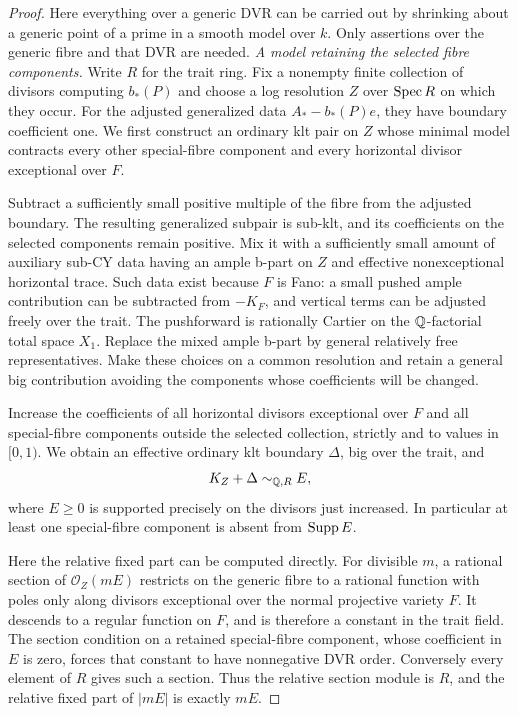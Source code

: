 \begin{proof}
Here everything over a generic DVR can be carried out by shrinking about a generic point of a prime in a smooth model over \(k\).
Only assertions over the generic fibre and that DVR are needed.
\emph{A model retaining the selected fibre components.}
Write $R$ for the trait ring.  Fix a nonempty finite collection of
divisors computing $b_*(P)$ and choose a log resolution $Z$ over
$\operatorname{Spec} R$ on which they occur.
For the adjusted generalized data $A_*-b_*(P)e$, they have boundary
coefficient one.  We first construct an ordinary klt pair on $Z$ whose
minimal model contracts every other special-fibre component and every
horizontal divisor exceptional over $F$.

Subtract a sufficiently small positive multiple of the fibre from the
adjusted boundary.  The resulting generalized subpair is sub-klt, and
its coefficients on the selected components remain positive.  Mix it
with a sufficiently small amount of auxiliary sub-CY data having an
ample b-part on $Z$ and effective nonexceptional horizontal trace.
Such data exist because $F$ is Fano: a small pushed ample contribution
can be subtracted from $-K_F$, and vertical terms can be adjusted freely
over the trait.  The pushforward is rationally Cartier on the
$\mathbb Q$-factorial total space $X_1$.
Replace the mixed ample b-part by general relatively free
representatives.  Make these choices on a common resolution and retain
a general big contribution avoiding the components whose coefficients
will be changed.

Increase the coefficients of all horizontal divisors exceptional over
$F$ and all special-fibre components outside the selected collection,
strictly and to values in $[0,1)$.  We obtain an effective ordinary klt
boundary $\Delta$, big over the trait, and
\[
                    K_Z+\Delta\sim_{\mathbb Q,R}E,
\]
where $E\ge0$ is supported precisely on the divisors just increased.
In particular at least one special-fibre component is absent from
$\operatorname{Supp} E$.

Here the relative fixed part can be computed directly.  For divisible
$m$, a rational section of $\mathcal O_Z(mE)$ restricts on the generic
fibre to a rational function with poles only along divisors exceptional
over the normal projective variety $F$.  It descends to a regular
function on $F$, and is therefore a constant in the trait field.
The section condition on a retained special-fibre component, whose
coefficient in $E$ is zero, forces that constant to have nonnegative
DVR order.  Conversely every element of $R$ gives such a section.
Thus the relative section module is $R$, and the relative fixed part
of $|mE|$ is exactly $mE$.


\end{proof}
